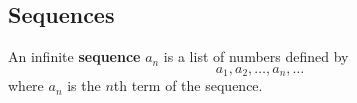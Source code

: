 \subsection{Sequences}
An infinite \textbf{sequence} \(a_n\) is a list of numbers defined by
\[a_1,a_2,\dots,a_n,\dots\]
where \(a_n\) is the \(n\)th term of the sequence.